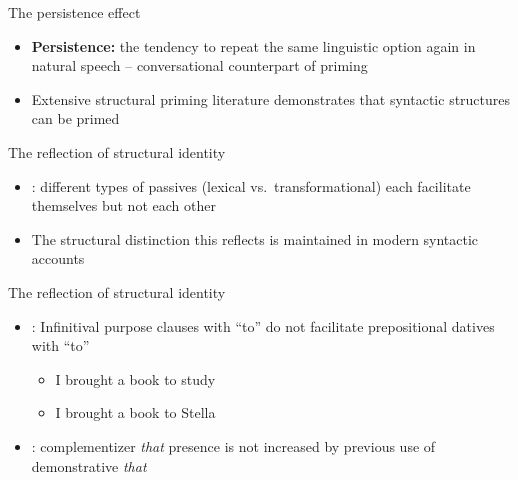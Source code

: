 \documentclass{digs-slides}
\newcommand{\includegraph}[2][]{\mode<beamer>{\texttt{[image: \#2]}}
    \mode<handout>{\texttt{[image: \#2]}}}
\begin{document}
\begin{frame}{The persistence effect}
	\begin{itemize}
       		\item \textbf{Persistence:} the tendency to repeat the same linguistic option again in natural speech -- conversational counterpart of priming
		\item Extensive structural priming
                  literature \parencite[beginning with][]{Bock:1986}
                  demonstrates that syntactic structures can be primed
			\end{itemize}
\end{frame}

\begin{frame}{The reflection of structural identity}
	\begin{itemize}
          \item \textcite{Estival:1985}: different types of passives (lexical vs.\ transformational) each facilitate themselves but not each other
          \item The structural distinction this reflects is maintained in modern syntactic accounts \parencite[e.g.][]{Embick:2004}
	\end{itemize}
        \begin{center}
            \includegraph{figures/estival}
        \end{center}
\end{frame}


\begin{frame}{The reflection of structural identity} %
	\begin{itemize}
          \item \textcite{Bock:1990}: Infinitival purpose clauses with
            “to” do not facilitate prepositional datives with “to”
            \begin{itemize}
              \item I brought a book to study
              \item I brought a book to Stella
            \end{itemize}
          \item \textcite{Ferreira:2003}: complementizer \textit{that}
            presence is not increased by previous use of demonstrative \textit{that}
	\end{itemize}
\end{frame}
\end{document}
